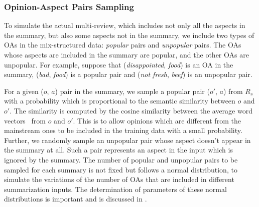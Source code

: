 \subsubsection{Opinion-Aspect Pairs Sampling}
\label{sec:OAsample}
To simulate the actual multi-review, which includes not only all the aspects in the summary,
but also some aspects not in the summary,
we include two types of OAs in the mix-structured data:
{\em popular} pairs and {\em unpopular} pairs.
The OAs whose aspects are included in the summary are popular,
and the other OAs are unpopular.
For example, suppose that (\textit{disappointed}, \textit{food}) is an OA in the summary,
(\textit{bad}, \textit{food}) is a popular pair and (\textit{not fresh}, \textit{beef}) is an 
unpopular pair.

For a given ($o$, $a$) pair in the summary, we sample a popular pair ($o'$, $a$) from $R_s$ 
with a probability which is proportional to the semantic similarity between $o$ and $o'$.
The similarity is computed by the cosine similarity between the average word 
vectors~\cite{glove} from $o$ and $o'$. 
This is to allow opinions which are different from the mainstream ones to be included in
the training data with a small probability. 
Further, we randomly sample an unpopular pair whose aspect doesn't appear 
in the summary at all. Such a pair represents an aspect in the input which is ignored
by the summary.
The number of popular and unpopular pairs to be sampled for each summary is not fixed
but follows a normal distribution, to simulate the variations of the number of OAs 
that are included in different summarization inputs. The determination of parameters of
these normal distributions is important and is discussed in .


